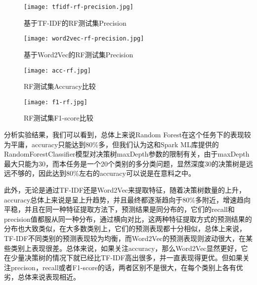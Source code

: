 \documentclass[lang=cn,11pt]{elegantpaper}
\begin{document}
  \begin{figure}[!htbp]
    \begin{minipage}[t]{0.5\linewidth}
    \centering
    \texttt{[image: tfidf-rf-precision.jpg]}
    \caption{基于TF-IDF的RF测试集Precision}
    \label{fig:side:a}
    \end{minipage}
    \begin{minipage}[t]{0.5\linewidth}
    \centering
    \texttt{[image: word2vec-rf-precision.jpg]}
    \caption{基于Word2Vec的RF测试集Precision}
    \label{fig:side:b}
    \end{minipage}
    \end{figure}

    \begin{figure}[!htbp]
      \begin{minipage}[t]{0.5\linewidth}
      \centering
      \texttt{[image: acc-rf.jpg]}
      \caption{RF测试集Accuracy比较}
      \label{fig:side:a}
      \end{minipage}
      \begin{minipage}[t]{0.5\linewidth}
      \centering
      \texttt{[image: f1-rf.jpg]}
      \caption{RF测试集F1-score比较}
      \label{fig:side:b}
      \end{minipage}
    \end{figure}
分析实验结果，我们可以看到，总体上来说Random Forest在这个任务下的表现较为平庸，accuracy只能达到80\%多，但我们认为这和Spark ML库提供的RandomForestClassifier模型对决策树maxDepth参数的限制有关，由于maxDepth最大只能为30，而本任务是一个20个类别的多分类问题，显然深度30的决策树是远远不够的，因此达到80\%左右的accuracy可以说是在意料之中。\par
此外，无论是通过TF-IDF还是Word2Vec来提取特征，随着决策树数量的上升，accuracy总体上来说是呈上升趋势，并且最终都逐渐趋向于80\%多附近，增速趋向平稳，并且在同一种特征提取方法下，预测结果是同分布的，它们的recall和precision值都服从同一种分布，通过横向对比，这两种特征提取方式的预测结果的分布也大致类似，在大多数类别上，它们的预测表现都十分相似，总体上来说，TF-IDF不同类别的预测表现较为均衡，而Word2Vec的预测表现则波动很大，在某些类别上表现很差。总体来说，如果关注accuracy，那么Word2Vec显然更好，它在少量决策树的情况下就已经比TF-IDF高出很多，并一直表现得更优。但如果关注precison，recall或者F1-score的话，两者区别不是很大，在每个类别上各有优劣，总体来说表现相近。
\end{document}

